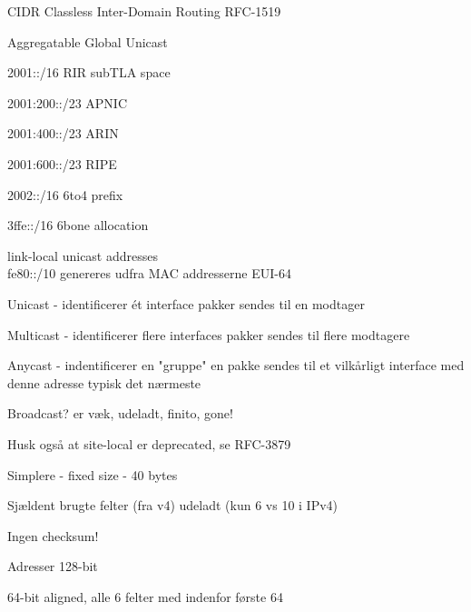 \documentclass[Screen16to9,17pt]{foils}
\begin{document}

\begin{list1}
\item CIDR Classless Inter-Domain Routing RFC-1519
\item Aggregatable Global Unicast
\item 2001::/16 RIR subTLA space
\begin{list2}
\item 2001:200::/23 APNIC
\item 2001:400::/23 ARIN
\item 2001:600::/23 RIPE
\end{list2}
\item 2002::/16 6to4 prefix
\item 3ffe::/16 6bone allocation
\item link-local unicast addresses\\
fe80::/10 genereres udfra MAC addresserne EUI-64
\end{list1}


\begin{list1}
\item Unicast - identificerer ét interface
pakker sendes til en modtager

\item Multicast - identificerer flere interfaces
pakker sendes til flere modtagere

\item Anycast - indentificerer en "gruppe"
en pakke sendes til et vilkårligt interface med denne adresse typisk det nærmeste

\item Broadcast?
er væk, udeladt, finito, gone!

\item Husk også at site-local er deprecated, se RFC-3879
\end{list1}


\begin{list2}
\item Simplere - fixed size - 40 bytes
\item Sjældent brugte felter (fra v4) udeladt (kun 6 vs 10 i IPv4)
\item Ingen checksum!
\item Adresser 128-bit
\item 64-bit aligned, alle 6 felter med indenfor første 64
\end{list2}
\end{document}
